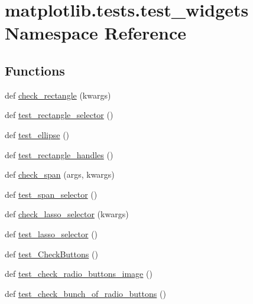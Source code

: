 \hypertarget{namespacematplotlib_1_1tests_1_1test__widgets}{}\section{matplotlib.\+tests.\+test\+\_\+widgets Namespace Reference}
\label{namespacematplotlib_1_1tests_1_1test__widgets}
\subsection*{Functions}
\begin{DoxyCompactItemize}
\item 
def \hyperlink{namespacematplotlib_1_1tests_1_1test__widgets_aac82758f0a7de8b914762ffb9f694d39}{check\+\_\+rectangle} (kwargs)
\item 
def \hyperlink{namespacematplotlib_1_1tests_1_1test__widgets_aef49a46463725bbc3c103589bd59babe}{test\+\_\+rectangle\+\_\+selector} ()
\item 
def \hyperlink{namespacematplotlib_1_1tests_1_1test__widgets_a7f052f4e4697c4f0bfce1d2477bedb7a}{test\+\_\+ellipse} ()
\item 
def \hyperlink{namespacematplotlib_1_1tests_1_1test__widgets_a8296f2c7f513375ca18341437bc9a016}{test\+\_\+rectangle\+\_\+handles} ()
\item 
def \hyperlink{namespacematplotlib_1_1tests_1_1test__widgets_a88308b3a9904e6d9cd0e77b2faee4637}{check\+\_\+span} (args, kwargs)
\item 
def \hyperlink{namespacematplotlib_1_1tests_1_1test__widgets_a0219acd3c5f440626882189def587b00}{test\+\_\+span\+\_\+selector} ()
\item 
def \hyperlink{namespacematplotlib_1_1tests_1_1test__widgets_a972878469ae48ece4185b2305cb58ded}{check\+\_\+lasso\+\_\+selector} (kwargs)
\item 
def \hyperlink{namespacematplotlib_1_1tests_1_1test__widgets_a5ed1f950ef90aaa69d1aba69d0b574fa}{test\+\_\+lasso\+\_\+selector} ()
\item 
def \hyperlink{namespacematplotlib_1_1tests_1_1test__widgets_a9e0a4c9f50cb0f7b0bc614d8747e4af3}{test\+\_\+\+Check\+Buttons} ()
\item 
def \hyperlink{namespacematplotlib_1_1tests_1_1test__widgets_abf081d446c52b480062f80577d62c86d}{test\+\_\+check\+\_\+radio\+\_\+buttons\+\_\+image} ()
\item 
def \hyperlink{namespacematplotlib_1_1tests_1_1test__widgets_a75d6c5f34cd139393161ad66bfaa755e}{test\+\_\+check\+\_\+bunch\+\_\+of\+\_\+radio\+\_\+buttons} ()

\end{DoxyCompactItemize}
